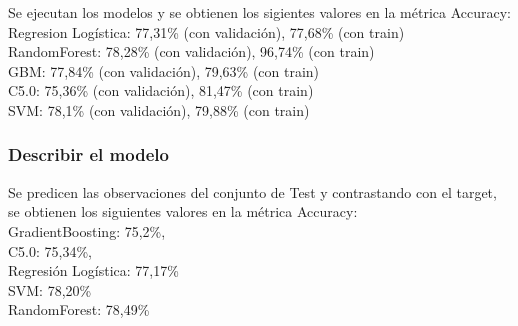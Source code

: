 Se ejecutan los modelos y se obtienen los sigientes valores en la métrica Accuracy:\\
Regresion Logística: 77,31\% (con validación), 77,68\% (con train)\\
RandomForest: 78,28\% (con validación), 96,74\% (con train)\\
GBM: 77,84\% (con validación), 79,63\% (con train)\\
C5.0: 75,36\% (con validación), 81,47\% (con train)\\
SVM: 78,1\% (con validación), 79,88\% (con train)

\subsubsection{Describir el modelo}

Se predicen las observaciones del conjunto de Test y contrastando con el target, se obtienen los siguientes valores en la métrica Accuracy:\\
GradientBoosting: 75,2\%,\\
C5.0: 75,34\%,\\
Regresión Logística: 77,17\%\\
SVM: 78,20\%\\
RandomForest: 78,49\%


%
%
%
%
